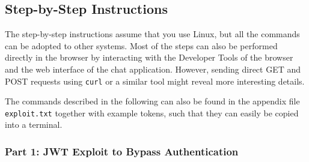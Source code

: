 \documentclass[12pt,a4paper]{article}
\newcommand{\code}[1]{\texttt{#1}}
\begin{document}
\subsection{Step-by-Step Instructions}

The step-by-step instructions assume that you use Linux, but all the commands can be adopted to other systems. Most of the steps can also be performed directly in the browser by interacting with the Developer Tools of the browser and the web interface of the chat application. However, sending direct GET and POST requests using \code{curl} or a similar tool might reveal more interesting details.

The commands described in the following can also be found in the appendix file \code{exploit.txt} together with example tokens, such that they can easily be copied into a terminal.

\subsubsection{Part 1: JWT Exploit to Bypass Authentication}
\end{document}
